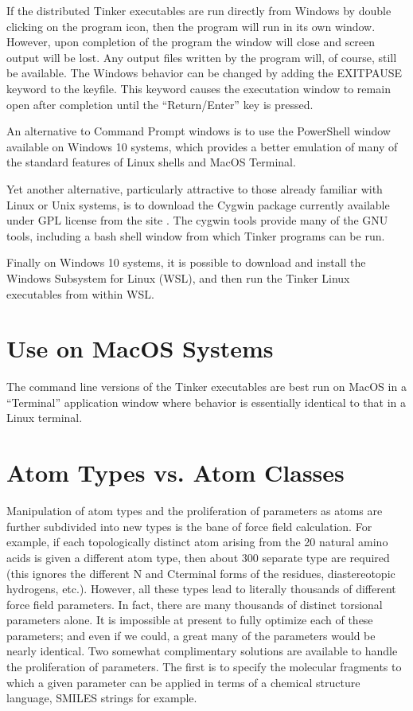 \documentclass[letterpaper,11pt,english]{sphinxmanual}
\begin{document}
\sphinxAtStartPar
If the distributed Tinker executables are run directly from Windows by double clicking on the program icon, then the program will run in its own window. However, upon completion of the program the window will close and screen output will be lost. Any output files written by the program will, of course, still be available. The Windows behavior can be changed by adding the EXIT\sphinxhyphen{}PAUSE keyword to the keyfile. This keyword causes the executation window to remain open after completion until the “Return/Enter” key is pressed.

\sphinxAtStartPar
An alternative to Command Prompt windows is to use the PowerShell window available on Windows 10 systems, which provides a better emulation of many of the standard features of Linux shells and MacOS Terminal.

\sphinxAtStartPar
Yet another alternative, particularly attractive to those already familiar with Linux or Unix systems, is to download the Cygwin package currently available under GPL license from the site . The cygwin tools provide many of the GNU tools, including a bash shell window from which Tinker programs can be run.

\sphinxAtStartPar
Finally on Windows 10 systems, it is possible to download and install the Windows Subsystem for Linux (WSL), and then run the Tinker Linux executables from within WSL.


\section{Use on MacOS Systems}
\label{\detokenize{text/special-features:use-on-macos-systems}}
\sphinxAtStartPar
The command line versions of the Tinker executables are best run on MacOS in a “Terminal” application window where behavior is essentially identical to that in a Linux terminal.


\section{Atom Types vs. Atom Classes}
\label{\detokenize{text/special-features:atom-types-vs-atom-classes}}
\sphinxAtStartPar
Manipulation of atom types and the proliferation of parameters as atoms are further subdivided into new types is the bane of force field calculation. For example, if each topologically distinct atom arising from the 20 natural amino acids is given a different atom type, then about 300 separate type are required (this ignores the different N\sphinxhyphen{} and C\sphinxhyphen{}terminal forms of the residues, diastereotopic hydrogens, etc.). However, all these types lead to literally thousands of different force field parameters. In fact, there are many thousands of distinct torsional parameters alone. It is impossible at present to fully optimize each of these parameters; and even if we could, a great many of the parameters would be nearly identical. Two somewhat complimentary solutions are available to handle the proliferation of parameters. The first is to specify the molecular fragments to which a given parameter can be applied in terms of a chemical structure language, SMILES strings for example.
\end{document}
